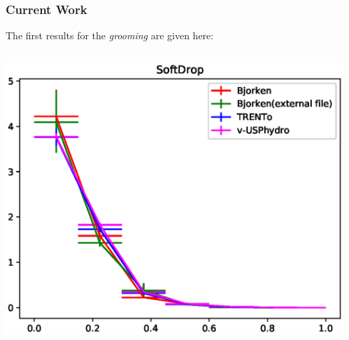 \documentclass{beamer}
\begin{document}
\begin{frame}\frametitle{Current Work}
	\begin{minipage}{1\textwidth}
	The first results for the \emph{grooming} are given here:
    \end{minipage}
    \begin{columns}
    \begin{column}{0.5\textwidth}
	\begin{minipage}[l]{0.5\textwidth}
	\includegraphics[scale=0.4]{images/softdrop.eps}
	\end{minipage}
	\end{column}
    \begin{column}{0.4\textwidth}
	\begin{minipage}[r]{1\textwidth}
	
	\end{minipage}
	\end{column}
	\end{columns}
\end{frame}
\end{document}

